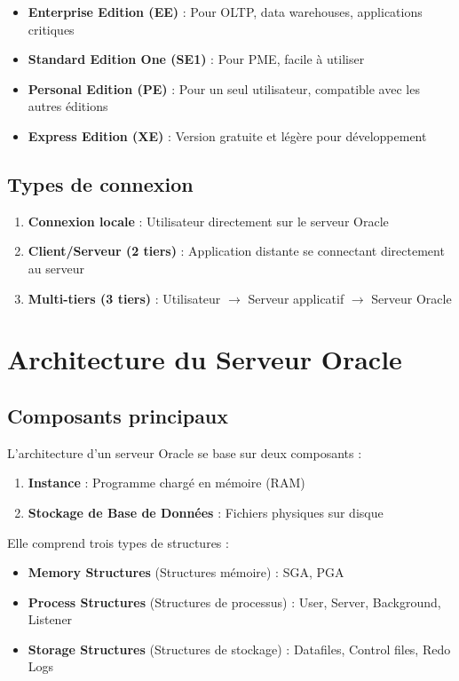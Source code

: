 \documentclass[12pt,a4paper]{article}
\begin{document}
\begin{itemize}
    \item \textbf{Enterprise Edition (EE)} : Pour OLTP, data warehouses, applications critiques
    \item \textbf{Standard Edition One (SE1)} : Pour PME, facile à utiliser
    \item \textbf{Personal Edition (PE)} : Pour un seul utilisateur, compatible avec les autres éditions
    \item \textbf{Express Edition (XE)} : Version gratuite et légère pour développement
\end{itemize}

\subsection{Types de connexion}

\begin{enumerate}
    \item \textbf{Connexion locale} : Utilisateur directement sur le serveur Oracle
    \item \textbf{Client/Serveur (2 tiers)} : Application distante se connectant directement au serveur
    \item \textbf{Multi-tiers (3 tiers)} : Utilisateur $\rightarrow$ Serveur applicatif $\rightarrow$ Serveur Oracle
\end{enumerate}

\section{Architecture du Serveur Oracle}

\subsection{Composants principaux}

L'architecture d'un serveur Oracle se base sur deux composants :
\begin{enumerate}
    \item \textbf{Instance} : Programme chargé en mémoire (RAM)
    \item \textbf{Stockage de Base de Données} : Fichiers physiques sur disque
\end{enumerate}

Elle comprend trois types de structures :
\begin{itemize}
    \item \textbf{Memory Structures} (Structures mémoire) : SGA, PGA
    \item \textbf{Process Structures} (Structures de processus) : User, Server, Background, Listener
    \item \textbf{Storage Structures} (Structures de stockage) : Datafiles, Control files, Redo Logs
\end{itemize}
\end{document}
